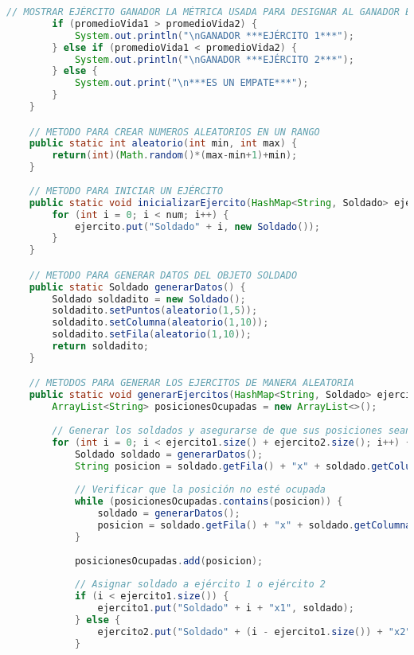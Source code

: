 \documentclass{article}
\begin{document}
\begin{itemize}
\begin{itemize}
\begin{lstlisting}[language=java]
        // MOSTRAR EJÉRCITO GANADOR LA MÉTRICA USADA PARA DESIGNAR AL GANADOR ES EL PROMEDIO DEL NIVEL DE VIDA DE CADA EJÉRCITO
        if (promedioVida1 > promedioVida2) {
            System.out.println("\nGANADOR ***EJÉRCITO 1***");
        } else if (promedioVida1 < promedioVida2) {
            System.out.println("\nGANADOR ***EJÉRCITO 2***");
        } else {
            System.out.print("\n***ES UN EMPATE***");
        }
    }

    // METODO PARA CREAR NUMEROS ALEATORIOS EN UN RANGO
	public static int aleatorio(int min, int max) {
		return(int)(Math.random()*(max-min+1)+min);
	}
    
    // METODO PARA INICIAR UN EJÉRCITO
    public static void inicializarEjercito(HashMap<String, Soldado> ejercito, int num) {
        for (int i = 0; i < num; i++) {
            ejercito.put("Soldado" + i, new Soldado());
        }
    }

	// METODO PARA GENERAR DATOS DEL OBJETO SOLDADO
	public static Soldado generarDatos() {
		Soldado soldadito = new Soldado();
		soldadito.setPuntos(aleatorio(1,5));
		soldadito.setColumna(aleatorio(1,10));
		soldadito.setFila(aleatorio(1,10));
		return soldadito;
	}

	// METODOS PARA GENERAR LOS EJERCITOS DE MANERA ALEATORIA
    public static void generarEjercitos(HashMap<String, Soldado> ejercito1, HashMap<String, Soldado> ejercito2, HashMap<String, Soldado> tablero) {
        ArrayList<String> posicionesOcupadas = new ArrayList<>();
        
        // Generar los soldados y asegurarse de que sus posiciones sean únicas
        for (int i = 0; i < ejercito1.size() + ejercito2.size(); i++) {
            Soldado soldado = generarDatos();
            String posicion = soldado.getFila() + "x" + soldado.getColumna();
            
            // Verificar que la posición no esté ocupada
            while (posicionesOcupadas.contains(posicion)) {
                soldado = generarDatos();
                posicion = soldado.getFila() + "x" + soldado.getColumna();
            }
            
            posicionesOcupadas.add(posicion);
            
            // Asignar soldado a ejército 1 o ejército 2
            if (i < ejercito1.size()) {
                ejercito1.put("Soldado" + i + "x1", soldado);
            } else {
                ejercito2.put("Soldado" + (i - ejercito1.size()) + "x2", soldado);
            }
            

\end{lstlisting}
\end{itemize}
\end{itemize}
\end{document}
